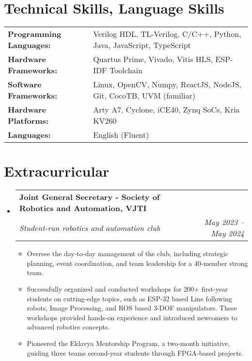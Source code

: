 \documentclass[letterpaper,11pt]{article}
\makeatletter
\newcommand{\resumeItem}[1]{
  \item\small{
    {#1 \vspace{-2pt}}
  }
}
\newcommand{\resumeSubheading}[4]{
  \vspace{-2pt}\item
    \begin{tabular*}{1.0\textwidth}[t]{l@{\extracolsep{\fill}}r}
      \textbf{#1} & \textbf{\small #2} \\
      \textit{\small#3} & \textit{\small #4} \\
    \end{tabular*}\vspace{-7pt}
}
\newcommand{\resumeSubHeadingListStart}{\begin{itemize}[leftmargin=0.0in, label={}]}
\newcommand{\resumeSubHeadingListEnd}{\end{itemize}}
\newcommand{\resumeItemListStart}{\begin{itemize}}
\newcommand{\resumeItemListEnd}{\end{itemize}\vspace{-5pt}}
\makeatother
\begin{document}
\section{Technical Skills, Language Skills}
\begin{tabular}{ll}
  \textbf{Programming Languages:} & Verilog HDL, TL-Verilog, C/C++, Python, Java, JavaScript, TypeScript \\
  \textbf{Hardware Frameworks:}   & Quartus Prime, Vivado, Vitis HLS, ESP-IDF Toolchain                  \\
  \textbf{Software Frameworks:}   & Linux, OpenCV, Numpy, ReactJS, NodeJS, Git, CocoTB, UVM (familiar)   \\
  \textbf{Hardware Platforms:}    & Arty A7, Cyclone, iCE40, Zynq SoCs, Kria KV260                       \\
  \textbf{Languages:}             & English (Fluent)                                                   
\end{tabular}

\section{Extracurricular}
\resumeSubHeadingListStart
\resumeSubheading
{Joint General Secretary - Society of Robotics and Automation, VJTI}{}{Student-run robotics and automation club \href{https://sravjti.in}{\faExternalLink}}{May 2023 -- May 2024}
\resumeItemListStart
\resumeItem{Oversee the day-to-day management of the club, including strategic planning, event coordination, and team leadership for a 40-member strong team.}
\resumeItem{Successfully organized and conducted workshops for 200+ first-year students on cutting-edge topics, such as ESP-32 based Line following robots, Image Processing, and ROS based 3-DOF manipulators. These workshops provided hands-on experience and introduced newcomers to advanced robotics concepts.}
\resumeItem{Pioneered the Eklavya Mentorship Program, a two-month initiative, guiding three teams second-year students through FPGA-based projects.}
\resumeItemListEnd
\resumeSubHeadingListEnd
\end{document}
